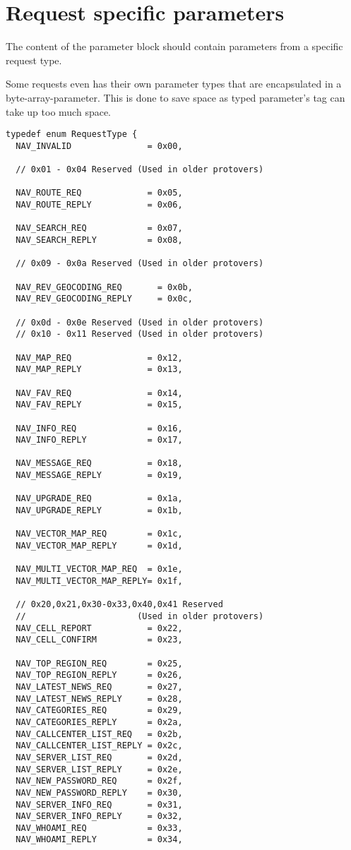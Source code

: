\documentclass[a4paper]{article}
\begin{document}



\section{Request specific parameters}


The content of the parameter block should contain parameters from a specific
request type. 

Some requests even has their own parameter types that are 
encapsulated in a byte-array-parameter. This is done to save space as 
typed parameter's tag can take up too much space.


\begin{verbatim}
typedef enum RequestType {
  NAV_INVALID               = 0x00,

  // 0x01 - 0x04 Reserved (Used in older protovers)

  NAV_ROUTE_REQ             = 0x05,        
  NAV_ROUTE_REPLY           = 0x06,

  NAV_SEARCH_REQ            = 0x07,         
  NAV_SEARCH_REPLY          = 0x08,

  // 0x09 - 0x0a Reserved (Used in older protovers)

  NAV_REV_GEOCODING_REQ       = 0x0b,
  NAV_REV_GEOCODING_REPLY     = 0x0c,

  // 0x0d - 0x0e Reserved (Used in older protovers)
  // 0x10 - 0x11 Reserved (Used in older protovers)

  NAV_MAP_REQ               = 0x12,
  NAV_MAP_REPLY             = 0x13,

  NAV_FAV_REQ               = 0x14,
  NAV_FAV_REPLY             = 0x15,

  NAV_INFO_REQ              = 0x16,
  NAV_INFO_REPLY            = 0x17,

  NAV_MESSAGE_REQ           = 0x18,
  NAV_MESSAGE_REPLY         = 0x19,

  NAV_UPGRADE_REQ           = 0x1a,
  NAV_UPGRADE_REPLY         = 0x1b,

  NAV_VECTOR_MAP_REQ        = 0x1c,
  NAV_VECTOR_MAP_REPLY      = 0x1d,

  NAV_MULTI_VECTOR_MAP_REQ  = 0x1e,
  NAV_MULTI_VECTOR_MAP_REPLY= 0x1f,

  // 0x20,0x21,0x30-0x33,0x40,0x41 Reserved 
  //                      (Used in older protovers)
  NAV_CELL_REPORT           = 0x22,
  NAV_CELL_CONFIRM          = 0x23,

  NAV_TOP_REGION_REQ        = 0x25,
  NAV_TOP_REGION_REPLY      = 0x26,
  NAV_LATEST_NEWS_REQ       = 0x27,
  NAV_LATEST_NEWS_REPLY     = 0x28,
  NAV_CATEGORIES_REQ        = 0x29,
  NAV_CATEGORIES_REPLY      = 0x2a,
  NAV_CALLCENTER_LIST_REQ   = 0x2b,
  NAV_CALLCENTER_LIST_REPLY = 0x2c,
  NAV_SERVER_LIST_REQ       = 0x2d,
  NAV_SERVER_LIST_REPLY     = 0x2e,
  NAV_NEW_PASSWORD_REQ      = 0x2f,
  NAV_NEW_PASSWORD_REPLY    = 0x30,
  NAV_SERVER_INFO_REQ       = 0x31,
  NAV_SERVER_INFO_REPLY     = 0x32,
  NAV_WHOAMI_REQ            = 0x33,
  NAV_WHOAMI_REPLY          = 0x34,


\end{verbatim}
\end{document}

